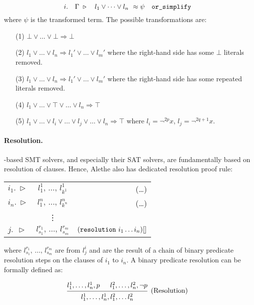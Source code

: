 \begin{equation}
i. \quad \Gamma~\triangleright \quad l_1 \lor \dots \lor l_n ~ \approx \psi \quad \tt{or\_simplify}
\end{equation}
where $\psi$ is the transformed term. The possible transformations are:
\begin{enumerate}
\item[(1)] $\bot \lor \dots \lor \bot \Rightarrow \bot$
\item[(2)] $l_1 \lor \dots \lor l_n \Rightarrow l_1' \lor \dots \lor l_m'$ where the right-hand side has some $\bot$ literals removed.
\item[(3)]  $l_1 \lor \dots \lor l_n \Rightarrow l_1' \lor \dots \lor l_m'$ where the right-hand side has some repeated literals removed.
\item[(4)] $l_1 \lor \dots \lor \top \lor \dots \lor l_n \Rightarrow \top$
\item[(5)] $l_1 \lor \dots \lor l_i \lor \dots \lor l_j \lor \dots \lor  l_n \Rightarrow \top$ where $l_i = \neg^{2p} x$, $l_j = \neg^{2q+1} x$.
\end{enumerate}

\paragraph{Resolution.}
{\cdclt}-based SMT solvers, and especially their SAT solvers, are fundamentally based on resolution of clauses.
Hence, Alethe also has dedicated resolution proof rule:

\medskip

\begin{tabular}{l c r}
$i_1.~\triangleright$  & \qquad $l_1^1,\, \dots,\, l_{k^1}^1$ \qquad & (\dots)  \\
$i_n.~\triangleright$  & \qquad $l_1^n,\, \dots,\, l_{k^n}^n$ \qquad & (\dots) \\
  & \vdots  &  \\
$j.~~\triangleright$  & \qquad $l_{s_1}^{r_1},\, \dots,\, l_{s_m}^{r_m}$ \qquad & $(\kw{resolution}~i_1 \dots i_n)[]$
\end{tabular}

\medskip

where $l_{s_1}^{r_1},\, \dots,\, l_{s_m}^{r_m}$ are from $l^i_j$ and are the result of a chain of binary predicate resolution steps on the clauses of $i_1$ to $i_n$.
A binary predicate resolution can be formally defined as:

\begin{equation*}\label{eq:bin-resolution}
\begin{prooftree}
  \hypo{ l^1_1, \dots, l^1_n, p }
  \hypo{ l^2_1, \dots, l^2_n, \neg p }
  \infer2[(Resolution)]{  l_{1}^{1}, \dots, l^1_n, l^2_1, \dots  l_{n}^2 }
\end{prooftree}
\end{equation*}


